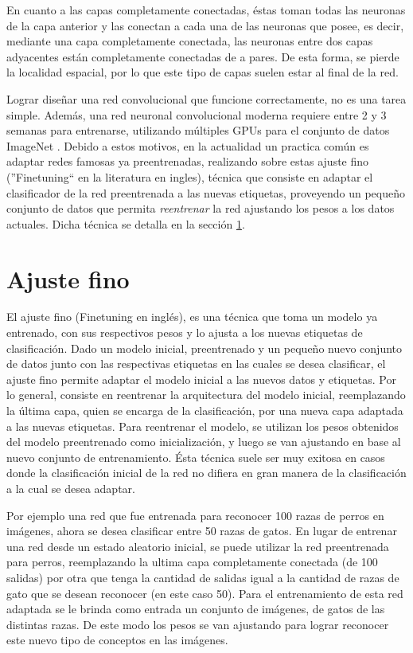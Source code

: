 \documentclass[a4paper,11pt,spanish]{book}
\begin{document}
      En cuanto a las capas completamente conectadas, éstas toman todas las neuronas de la capa anterior y las conectan a cada una de las neuronas que posee, es decir,
      mediante una capa completamente conectada, las neuronas entre dos capas adyacentes están completamente conectadas de a pares. De esta forma, se pierde la localidad espacial,
      por lo que este tipo de capas suelen estar al final de la red.
      
      Lograr diseñar una red convolucional que funcione correctamente, no es una tarea simple. Además, una red neuronal convolucional moderna requiere entre 2 y 3 semanas para entrenarse, 
      utilizando múltiples GPUs para el conjunto de datos ImageNet \cite{imagenet_cvpr09}. Debido a estos motivos, en la actualidad un practica común es adaptar
      redes famosas ya preentrenadas, realizando sobre estas ajuste fino (''Finetuning`` en la literatura en ingles), técnica que consiste en adaptar el clasificador de la 
      red preentrenada a las nuevas etiquetas, proveyendo un pequeño conjunto de datos que permita \emph{reentrenar} la red ajustando los pesos a los datos actuales.
      Dicha técnica se detalla en la sección \ref{sec:finetuning}.

    \section {Ajuste fino} \label{sec:finetuning}
      El ajuste fino (Finetuning en inglés), es una técnica que toma un modelo ya entrenado, con sus respectivos pesos y lo ajusta a los nuevas etiquetas de clasificación. 
      Dado un modelo inicial, preentrenado y un pequeño nuevo conjunto de datos junto con las respectivas etiquetas en las cuales se desea clasificar, el ajuste fino
      permite adaptar el modelo inicial a las nuevos datos y etiquetas.
      Por lo general, consiste en reentrenar la arquitectura del modelo inicial, reemplazando la última capa, quien se encarga de la clasificación, por una nueva capa
      adaptada a las nuevas etiquetas.
      Para reentrenar el modelo, se utilizan los pesos obtenidos del modelo preentrenado como inicialización, y luego se van ajustando en base al nuevo conjunto de entrenamiento.
      Ésta técnica suele ser muy exitosa en casos donde la clasificación inicial de la red no difiera en gran manera de la clasificación a la cual se desea adaptar.
      
      Por ejemplo una red que fue entrenada para reconocer 100 razas de perros en imágenes, ahora se desea clasificar entre 50 razas de gatos. 
      En lugar de entrenar una red desde un estado aleatorio inicial, se puede utilizar la red preentrenada para perros, reemplazando la ultima capa completamente conectada
      (de 100 salidas) por otra que tenga la cantidad de salidas igual a la cantidad de razas de gato que se desean reconocer (en este caso 50).
      Para el entrenamiento de esta red adaptada se le brinda como entrada un conjunto de imágenes, de gatos de las distintas razas. De este modo los pesos se van
      ajustando para lograr reconocer este nuevo tipo de conceptos en las imágenes.
 
\end{document}
